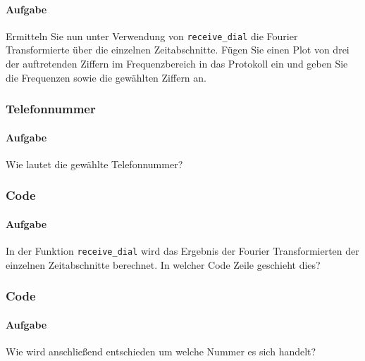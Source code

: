 \documentclass[10pt]{report}
\begin{document}
        \paragraph{Aufgabe}
        Ermitteln Sie nun unter Verwendung von \texttt{receive\_dial} die Fourier Transformierte
        über die einzelnen Zeitabschnitte. Fügen Sie einen Plot von drei der auftretenden
        Ziffern im Frequenzbereich in das Protokoll ein und geben Sie die Frequenzen sowie
        die gewählten Ziffern an.

        \subsubsection{Telefonnummer}
        \paragraph{Aufgabe}
        Wie lautet die gewählte Telefonnummer?


        \subsubsection{Code}
        \paragraph{Aufgabe}
        In der Funktion \texttt{receive\_dial} wird das Ergebnis der Fourier Transformierten der
        einzelnen Zeitabschnitte berechnet. In welcher Code Zeile geschieht dies?

        \subsubsection{Code}
        \paragraph{Aufgabe}
        Wie wird anschließend entschieden um welche Nummer es sich handelt?
\end{document}
